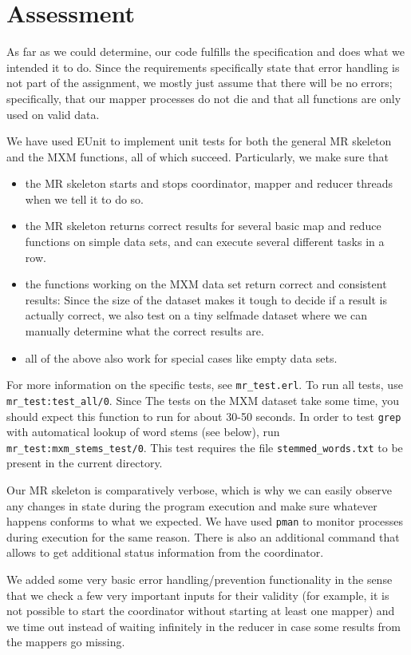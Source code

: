 \documentclass[a4paper]{article}
\begin{document}
\section*{Assessment}
As far as we could determine, our code fulfills the specification and does what we intended it to do. Since the requirements specifically state that error handling is not part of the assignment, we mostly just assume that there will be no errors; specifically, that our mapper processes do not die and that all functions are only used on valid data.

We have used EUnit to implement unit tests for both the general MR skeleton and the MXM functions, all of which succeed. Particularly, we make sure that
\begin{itemize}
  \item the MR skeleton starts and stops coordinator, mapper and reducer threads when we tell it to do so.
  \item the MR skeleton returns correct results for several basic map and reduce functions on simple data sets, and can execute several different tasks in a row.
  \item the functions working on the MXM data set return correct and consistent results: Since the size of the dataset makes it tough to decide if a result is actually correct, we also test on a tiny selfmade dataset where we can manually determine what the correct results are.
  \item all of the above also work for special cases like empty data sets.
\end{itemize}
For more information on the specific tests, see \texttt{mr\_test.erl}. To run all tests, use \texttt{mr\_test:test\_all/0}. Since The tests on the MXM dataset take some time, you should expect this function to run for about 30-50 seconds. In order to test \texttt{grep} with automatical lookup of word stems (see below), run \texttt{mr\_test:mxm\_stems\_test/0}. This test requires the file \texttt{stemmed\_words.txt} to be present in the current directory.

Our MR skeleton is comparatively verbose, which is why we can easily observe any changes in state during the program execution and make sure whatever happens conforms to what we expected. We have used \texttt{pman} to monitor processes during execution for the same reason. There is also an additional command that allows to get additional status information from the coordinator.

We added some very basic error handling/prevention functionality in the sense that we check a few very important inputs for their validity (for example, it is not possible to start the coordinator without starting at least one mapper) and we time out instead of waiting infinitely in the reducer in case some results from the mappers go missing.
\end{document}
